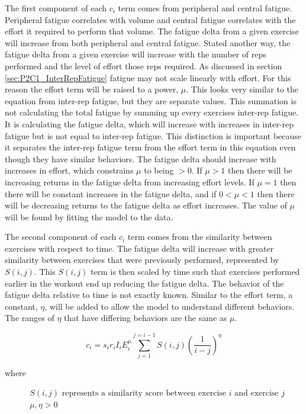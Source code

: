 The first component of each $c_i$ term comes from peripheral and central fatigue. Peripheral fatigue correlates with volume and central fatigue correlates with the effort it required to perform that volume. The fatigue delta from a given exercise will increase from both peripheral and central fatigue. Stated another way, the fatigue delta from a given exercise will increase with the number of reps performed and the level of effort those reps required. As discussed in section \ref{sec:P2C1_InterRepFatigue} fatigue may not scale linearly with effort. For this reason the effort term will be raised to a power, $\mu$. This looks very similar to the equation from inter-rep fatigue, but they are separate values. This summation is not calculating the total fatigue by summing up every exercises inter-rep fatigue. It is calculating the fatigue delta, which will increase with increases in inter-rep fatigue but is not equal to inter-rep fatigue. This distinction is important because it separates the inter-rep fatigue term from the effort term in this equation even though they have similar behaviors. The fatigue delta should increase with increases in effort, which constrains $\mu$ to being $>0$. If $\mu>1$ then there will be increasing returns in the fatigue delta from increasing effort levels. If $\mu=1$ then there will be constant increases in the fatigue delta, and if $0<\mu<1$ then there will be decreasing returns to the fatigue delta as effort increases. The value of $\mu$ will be found by fitting the model to the data.

The second component of each $c_i$ term comes from the similarity between exercises with respect to time. The fatigue delta will increase with greater similarity between exercises that were previously performed, represented by $S(i,j)$. This $S(i,j)$ term is then scaled by time such that exercises performed earlier in the workout end up reducing the fatigue delta. The behavior of the fatigue delta relative to time is not exactly known. Similar to the effort term, a constant, $\eta$, will be added to allow the model to understand different behaviors. The ranges of $\eta$ that have differing behaviors are the same as $\mu$.

\begin{minipage}{\textwidth}
	\begin{equation*}
		c_i=s_i r_i I_i E_i^\mu \sum_{j=1}^{j=i-1} S(i,j)\left(
			\frac{1}{i-j}
		\right)^\eta
	\end{equation*}
	\centerline{where}
	\begin{equation*}
		\begin{split}
			& S(i,j) \text{ represents a similarity score between exercise }i \text{ and exercise }j \\
			& \mu, \eta>0
		\end{split}
	\end{equation*}
\end{minipage}\\

